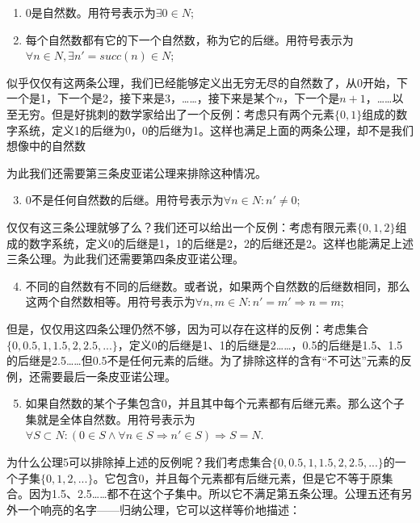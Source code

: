 \documentclass[UTF8]{article}
\begin{document}
\begin{enumerate}
\item 0是自然数。用符号表示为$\exists 0 \in N$;
\item 每个自然数都有它的下一个自然数，称为它的后继。用符号表示为$\forall n \in N, \exists n' = succ(n) \in N$;
\end{enumerate}

似乎仅仅有这两条公理，我们已经能够定义出无穷无尽的自然数了，从0开始，下一个是1，下一个是2，接下来是3，……，接下来是某个$n$，下一个是$n+1$，……以至无穷。但是好挑刺的数学家给出了一个反例：考虑只有两个元素$\{0, 1\}$组成的数字系统，定义1的后继为0，0的后继为1。这样也满足上面的两条公理，却不是我们想像中的自然数

为此我们还需要第三条皮亚诺公理来排除这种情况。

\begin{enumerate}
  \setcounter{enumi}{2}
  \item 0不是任何自然数的后继。用符号表示为$\forall n \in N: n' \neq 0$;
\end{enumerate}

仅仅有这三条公理就够了么？我们还可以给出一个反例：考虑有限元素$\{0, 1, 2\}$组成的数字系统，定义0的后继是1，1的后继是2，2的后继还是2。这样也能满足上述三条公理。为此我们还需要第四条皮亚诺公理。

\begin{enumerate}
  \setcounter{enumi}{3}
  \item 不同的自然数有不同的后继数。或者说，如果两个自然数的后继数相同，那么这两个自然数相等。用符号表示为$\forall n, m \in N: n' = m' \Rightarrow n = m$;
\end{enumerate}

但是，仅仅用这四条公理仍然不够，因为可以存在这样的反例：考虑集合$\{0, 0.5, 1, 1.5, 2, 2.5, ...\}$，定义0的后继是1、1的后继是2……，0.5的后继是1.5、1.5的后继是2.5……但0.5不是任何元素的后继。为了排除这样的含有“不可达”元素的反例，还需要最后一条皮亚诺公理。

\begin{enumerate}
  \setcounter{enumi}{4}
  \item 如果自然数的某个子集包含0，并且其中每个元素都有后继元素。那么这个子集就是全体自然数。用符号表示为$\forall S \subset N: (0 \in S \land \forall n \in S \Rightarrow n' \in S) \Rightarrow S = N$.
\end{enumerate}

为什么公理5可以排除掉上述的反例呢？我们考虑集合$\{0, 0.5, 1, 1.5, 2, 2.5, ...\}$的一个子集$\{0, 1, 2, ...\}$。它包含0，并且每个元素都有后继元素，但是它不等于原集合。因为1.5、2.5……都不在这个子集中。所以它不满足第五条公理。公理五还有另外一个响亮的名字——归纳公理，它可以这样等价地描述：
\end{document}
